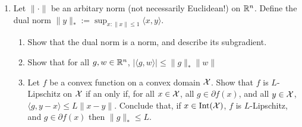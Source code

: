 \documentclass[12pt]{article}
\begin{document}
\begin{enumerate}
\begin{enumerate}
\end{enumerate}
\item 
Let  $\|\cdot\|$ be an arbitary norm (not necessarily Euclidean!)
on $\mathbb{R}^n$. Define the dual norm $\|y\|_* := \sup_{x: \|x\| \le 1}\langle x,y \rangle$. 
\begin{enumerate}
\item
Show that the dual norm is a norm, and describe its subgradient.
\item Show that for all $g,w \in \mathbb{R}^n$, $|\langle g, w \rangle| \le \|g\|_*\|w\|$
\item
Let $f$ be a convex function on a convex domain ${\cal X}$. Show that $f$ is $L$-Lipschitz on ${\cal X}$ if an only if, for all $x \in {\cal X}$, all $g \in \partial f(x)$, and all $y \in {\cal X}$, $\langle g, y-x \rangle \le L\|x-y\|$. Conclude that, if $x \in \mathrm{Int}({\cal X})$, $f$ is $L$-Lipschitz, and $g \in \partial f(x)$ then $\|g\|_* \le L$. 
\end{enumerate}
\end{enumerate}
\end{document}
